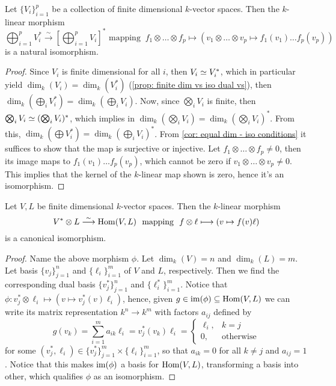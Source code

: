 \begin{proposition}\label{prop: dual tensor isomorphism}
  Let \(\{V_i\}_{i=1}^p\) be a collection of finite dimensional \(k\)-vector
  spaces. Then the \(k\)-linear morphism
  \[
    \bigoplus_{i=1}^p V_i^* \overset{\sim}\longrightarrow \left[ \bigoplus_{i=1}^p V_i \right]^*
    \text{ mapping }\
    f_1 \otimes \dots \otimes f_p \longmapsto (v_1 \otimes \dots \otimes v_p \mapsto
    f_1(v_1) \dots f_p(v_p))
  \]
  is a natural isomorphism.
\end{proposition}

\begin{proof}
  Since \(V_i\) is finite dimensional for all \(i\), then \(V_i \simeq V_i^*\),
  which in particular yield \(\dim_k(V_i) = \dim_k(V_i^*)\) (\cref{prop: finite
  dim vs iso dual vs}), then \(\dim_k(\bigoplus_i V_i^*) = \dim_k(\bigoplus_i
  V_i)\). Now, since \(\bigotimes_i V_i\) is finite, then \(\bigotimes_i V_i
  \simeq (\bigotimes_i V_i)^*\), which implies in \(\dim_k(\bigotimes_i V_i) =
  \dim_k(\bigotimes_i V_i)^*\). From this, \(\dim_k(\bigoplus V_i^*) =
  \dim_k(\bigoplus_i V_i)^*\). From \cref{cor: equal dim - iso conditions} it
  suffices to show that the map is surjective or injective. Let \(f_1 \otimes
  \dots \otimes f_p \neq 0\), then its image maps to \(f_1(v_1) \dots
  f_p(v_p)\), which cannot be zero if \(v_1 \otimes \dots \otimes v_p \neq 0\).
  This implies that the kernel of the \(k\)-linear map shown is zero, hence it's
  an isomorphism.
\end{proof}

\begin{proposition}\label{prop: tensor with dual iso hom}
  Let \(V, L\) be finite dimensional \(k\)-vector spaces. Then the \(k\)-linear
  morphism
  \[
    V^* \otimes L \overset{\sim}\longrightarrow \operatorname{Hom}(V, L)\ \text{ mapping }\ f \otimes \ell \longmapsto (v \mapsto f(v)\ell)
  \]
  is a canonical isomorphism.
\end{proposition}

\begin{proof}
  Name the above morphism \(\phi\). Let \(\dim_k(V) = n\) and \(\dim_k(L) = m\).
  Let basis \(\{v_j\}_{j=1}^n\) and \(\{\ell_i\}_{i=1}^m\) of \(V\) and \(L\),
  respectively. Then we find the corresponding dual basis \(\{v_j^*\}_{j=1}^n\)
  and \(\{\ell_i^*\}_{i=1}^m\). Notice that \(\phi :v_j^* \otimes \ell_i \mapsto
  (v \mapsto v_j^*(v) \ell_i)\), hence, given \(g \in \operatorname{im}(\phi) \subseteq
  \operatorname{Hom}(V, L)\) we can write its matrix representation \(k^n \to k^m\) with
  factors \(a_{ij}\) defined by
  \[
    g(v_k) = \sum_{i=1}^m a_{ik} \ell_i = v_j^*(v_k)\ell_i =
    \begin{cases}
      \ell_i, &k = j\\
      0, &\text{otherwise}
    \end{cases}
  \]
  for some \((v_j^*, \ell_i) \in \{v_j^*\}_{j=1}^m \times \{\ell_i\}_{i=1}^m\),
  so that \(a_{ik} = 0\) for all \(k \neq j\) and \(a_{ij} = 1\). Notice that
  this makes \(\operatorname{im}(\phi)\) a basis for \(\operatorname{Hom}(V, L)\), transforming a basis into
  other, which qualifies \(\phi\) as an isomorphism.
\end{proof}

